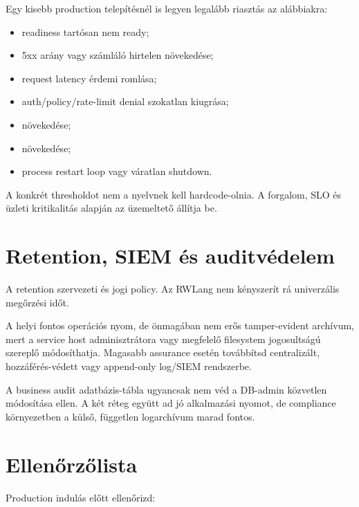 Egy kisebb production telepítésnél is legyen legalább riasztás az alábbiakra:

\begin{itemize}
  \item readiness tartósan nem ready;
  \item 5xx arány vagy számláló hirtelen növekedése;
  \item request latency érdemi romlása;
  \item auth/policy/rate-limit denial szokatlan kiugrása;
  \item {} növekedése;
  \item {} növekedése;
  \item process restart loop vagy váratlan shutdown.
\end{itemize}

A konkrét thresholdot nem a nyelvnek kell hardcode-olnia. A forgalom, SLO és üzleti kritikalitás alapján az üzemeltető állítja be.

\section{Retention, SIEM és auditvédelem}

A retention szervezeti és jogi policy. Az RWLang nem kényszerít rá univerzális megőrzési időt.

A helyi  fontos operációs nyom, de önmagában nem erős tamper-evident archívum, mert a service host adminisztrátora vagy megfelelő filesystem jogosultságú szereplő módosíthatja. Magasabb assurance esetén továbbítsd centralizált, hozzáférés-védett vagy append-only log/SIEM rendszerbe.

A business audit adatbázis-tábla ugyancsak nem véd a DB-admin közvetlen módosítása ellen. A két réteg együtt ad jó alkalmazási nyomot, de compliance környezetben a külső, független logarchívum marad fontos.

\section{Ellenőrzőlista}

Production indulás előtt ellenőrizd:


